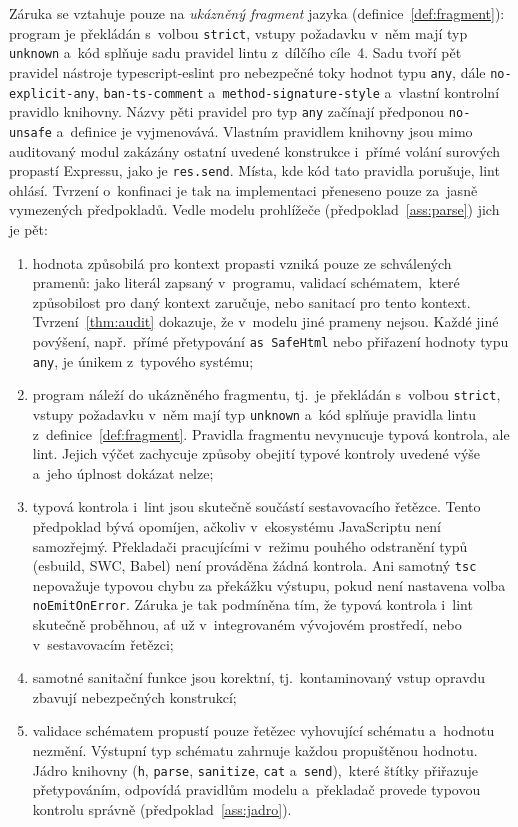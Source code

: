 Záruka se vztahuje pouze na \emph{ukázněný fragment} jazyka (definice~\ref{def:fragment}): program je překládán s~volbou \texttt{strict}, vstupy požadavku v~něm mají typ \texttt{unknown} a~kód splňuje sadu pravidel lintu z~dílčího cíle~4. Sadu tvoří pět pravidel nástroje typescript-eslint pro nebezpečné toky hodnot typu \texttt{any}, dále \texttt{no-explicit-any}, \texttt{ban-ts-comment} a~\texttt{method-{}\allowbreak signature-{}\allowbreak style} \parencite{tsEslintRules} a~vlastní kontrolní pravidlo knihovny. Názvy pěti pravidel pro typ \texttt{any} začínají předponou \texttt{no-unsafe} a~definice je vyjmenovává. Vlastním pravidlem knihovny jsou mimo auditovaný modul zakázány ostatní uvedené konstrukce i~přímé volání surových propastí Expressu, jako je \texttt{res.send}. Místa, kde kód tato pravidla porušuje, lint ohlásí. Tvrzení o~konfinaci je tak na implementaci přeneseno pouze za~jasně vymezených předpokladů. Vedle modelu prohlížeče (předpoklad~\ref{ass:parse}) jich je pět:
\begin{enumerate}
    \item hodnota způsobilá pro kontext propasti vzniká pouze ze schválených pramenů: jako literál zapsaný v~programu, validací schématem,~které způsobilost pro daný kontext zaručuje, nebo sanitací pro tento kontext. Tvrzení~\ref{thm:audit} dokazuje, že v~modelu jiné prameny nejsou. Každé jiné povýšení, např.~přímé přetypování \texttt{as SafeHtml} nebo přiřazení hodnoty typu \texttt{any}, je únikem z~typového systému;
    \item program náleží do ukázněného fragmentu, tj.~je překládán s~volbou \texttt{strict}, vstupy požadavku v~něm mají typ \texttt{unknown} a~kód splňuje pravidla lintu z~definice~\ref{def:fragment}. Pravidla fragmentu nevynucuje typová kontrola, ale lint. Jejich výčet zachycuje způsoby obejití typové kontroly uvedené výše a~jeho úplnost dokázat nelze;
    \item typová kontrola i~lint jsou skutečně součástí sestavovacího řetězce. Tento předpoklad bývá opomíjen, ačkoliv v~ekosystému JavaScriptu není samozřejmý. Překladači pracujícími v~režimu pouhého odstranění typů (esbuild, SWC, Babel) není prováděna žádná kontrola. Ani samotný \texttt{tsc} nepovažuje typovou chybu za překážku výstupu, pokud není nastavena volba \texttt{noEmitOnError}. Záruka je tak podmíněna tím, že typová kontrola i~lint skutečně proběhnou, ať už v~integrovaném vývojovém prostředí, nebo v~sestavovacím řetězci;
    \item samotné sanitační funkce jsou korektní, tj.~kontaminovaný vstup opravdu zbavují nebezpečných konstrukcí;
    \item validace schématem propustí pouze řetězec vyhovující schématu a~hodnotu nezmění. Výstupní typ schématu zahrnuje každou propuštěnou hodnotu. Jádro knihovny (\texttt{h}, \texttt{parse}, \texttt{sanitize}, \texttt{cat} a~\texttt{send}),~které štítky přiřazuje přetypováním, odpovídá pravidlům modelu a~překladač provede typovou kontrolu správně (předpoklad~\ref{ass:jadro}).
\end{enumerate}
